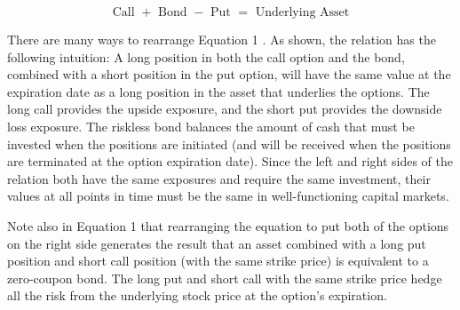 \documentclass[11pt]{article}
\begin{document}
\begin{equation*}
\text { Call }+ \text { Bond }- \text { Put }=\text { Underlying Asset } \tag{1}
\end{equation*}


There are many ways to rearrange Equation 1 . As shown, the relation has the following intuition: A long position in both the call option and the bond, combined with a short position in the put option, will have the same value at the expiration date as a long position in the asset that underlies the options. The long call provides the upside exposure, and the short put provides the downside loss exposure. The riskless bond balances the amount of cash that must be invested when the positions are initiated (and will be received when the positions are terminated at the option expiration date). Since the left and right sides of the relation both have the same exposures and require the same investment, their values at all points in time must be the same in well-functioning capital markets.

Note also in Equation 1 that rearranging the equation to put both of the options on the right side generates the result that an asset combined with a long put position and short call position (with the same strike price) is equivalent to a zero-coupon bond. The long put and short call with the same strike price hedge all the risk from the underlying stock price at the option's expiration.
\end{document}
